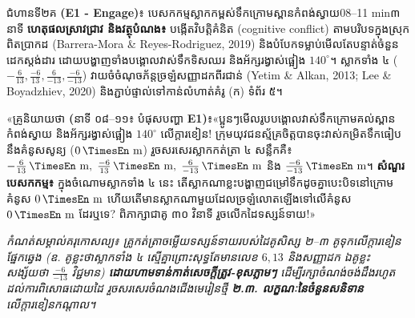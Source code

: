 \documentclass[a4paper,12pt]{article}
\newcommand{\en}[1]{{\TimesEn #1}}
\newcommand{\enbf}[1]{{\TimesEn\textbf{#1}}}
\newcommand{\unit}[1]{\,\text{\en{#1}}}
\newcommand{\teachersay}[1]{{\muol\fontsize{10.8pt}{15.5pt}\selectfont «គ្រូនិយាយថា \enbf{(}#1\enbf{)}៖}\hspace{0.25em}}
\begin{document}
\begin{phasebox}{ជំហានទី២គ \enbf{(E1 - Engage)}៖ បេសកកម្មស្លាកកម្ពស់ទឹកក្រោមស្ពានកំពង់ស្វាយ}{08--11 min}{៣ នាទី}
\textbf{ហេតុផលស្រាវជ្រាវ និងវត្ថុបំណង៖} បង្កើតវិបត្តិគំនិត (\en{cognitive conflict}) តាមបរិបទក្នុងស្រុកពិតប្រាកដ \en{(Barrera-Mora \& Reyes-Rodriguez, 2019)} និងបំបែកទម្លាប់មើលតែបន្ទាត់ចំនួនដេកស្ដង់ដារ ដោយបង្ហាញទាំងបង្គោលវាស់ទឹកទិសឈរ និងអ័ក្សរង្វាស់ផ្អៀង $140^\circ$។ ស្លាកទាំង ៤ ($-\frac{6}{13}, \frac{-6}{13}, \frac{6}{-13}, \frac{-6}{-13}$) វាយចំចំណុចភ័ន្តច្រឡំសញ្ញាដកពីរជាន់ \en{(Yetim \& Alkan, 2013; Lee \& Boyadzhiev, 2020)} និងភ្ជាប់ផ្ទាល់ទៅកាន់លំហាត់គំរូ (ក) ទំព័រ ៥។
\end{phasebox}
\begin{scriptbox}
  \teachersay{នាទី ០៨--១១៖ បំផុសបញ្ហា \enbf{E1}}«ប្អូនៗមើលរូបបង្គោលវាស់ទឹកក្រោមគល់ស្ពានកំពង់ស្វាយ និងអ័ក្សរង្វាស់ផ្អៀង $140^\circ$ លើក្ដារខៀន! ក្រុមយុវជនស្ម័គ្រចិត្តបានចុះវាស់កម្រិតទឹកធៀបនឹងគំនូសសូន្យ ($0\unit{m}$) រួចសរសេរស្លាកកត់ត្រា ៤ សន្លឹកគឺ៖ $-\frac{6}{13}\unit{m},\; \frac{-6}{13}\unit{m},\; \frac{6}{-13}\unit{m}$ និង $\frac{-6}{-13}\unit{m}$។ \textbf{សំណួរបេសកកម្ម៖} ក្នុងចំណោមស្លាកទាំង ៤ នេះ តើស្លាកណាខ្លះបង្ហាញជម្រៅទឹកដូចគ្នាបេះបិទនៅក្រោមគំនូស $0\unit{m}$ ហើយតើមានស្លាកណាមួយដែលច្រឡំលោតឡើងទៅលើគំនូស $0\unit{m}$ ដែរឬទេ? ពិភាក្សាជាគូ ៣០ វិនាទី រួចលើកដៃទស្សន៍ទាយ!»\par\vspace{2pt}
  {\itshape កំណត់សម្គាល់គរុកោសល្យ៖ គ្រូកត់ត្រាចម្លើយទស្សន៍ទាយរបស់ដៃគូសិស្ស ២--៣ គូទុកលើក្ដារខៀនផ្នែកឆ្វេង (ឧ. គូខ្លះថាស្លាកទាំង ៤ ស្មើគ្នាព្រោះសុទ្ធតែមានលេខ $6, 13$ និងសញ្ញាដក ឯគូខ្លះសង្ស័យថា $\frac{-6}{-13}$ វិជ្ជមាន) \textbf{ដោយហាមទាន់កាត់សេចក្ដីត្រូវ-ខុសភ្លាមៗ} ដើម្បីរក្សាចំណង់ចង់ដឹងរហូតដល់ការពិសោធដោយដៃ រួចសរសេរចំណងជើងមេរៀនថ្មី \textbf{២.៣. លក្ខណៈនៃចំនួនសនិទាន} លើក្ដារខៀនកណ្ដាល។}
\end{scriptbox}
\end{document}
